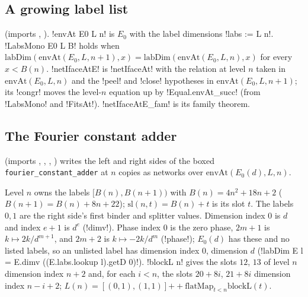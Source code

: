 {\subsection{A growing label list}

 (imports , ). \lbx!envAt E0 L n! is $E_0$ with the label dimensions \lbx!labs := L n!. \lbx!LabsMono E0 L B! holds when $\mathrm{labDim}(\mathrm{envAt}(E_0,L,n+1),x)=\mathrm{labDim}(\mathrm{envAt}(E_0,L,n),x)$ for every $x<B(n)$. \lbx!netIfaceAtE! is \lbx!netIfaceAt! with the relation at level $n$ taken in $\mathrm{envAt}(E_0,L,n)$ and the \lbx!peel! and \lbx!close! hypotheses in $\mathrm{envAt}(E_0,L,n+1)$; its \lbx!congr! moves the level-$n$ equation up by \lbx!Equal.envAt_succ! (from \lbx!LabsMono! and \lbx!FitsAt!). \lbx!netIfaceAtE_fam! is its family theorem.

\subsection{The Fourier constant adder}

 (imports , , , ) writes the left and right sides of the boxed \texttt{fourier\_constant\_adder} at $n$ copies as networks over $\mathrm{envAt}(E_0(d),L,n)$.

\begin{definition}\label{def:boxes-fca-env}
Level $n$ owns the labels $[B(n),B(n+1))$ with $B(n)=4n^2+18n+2$ ($B(n+1)=B(n)+8n+22$); $\mathrm{sl}(n,t)=B(n)+t$ is its slot $t$. The labels $0,1$ are the right side's first binder and splitter values. Dimension index $0$ is $d$ and index $e+1$ is $d^e$ (\lbx!dimv!). Phase index $0$ is the zero phase, $2m+1$ is $k\mapsto 2k/d^{m+1}$, and $2m+2$ is $k\mapsto -2k/d^{m}$ (\lbx!phase!); $E_0(d)$ has these and no listed labels, so an unlisted label has dimension index $0$, dimension $d$ (\lbx!labDim E l = E.dimv ((E.labs.lookup l).getD 0)!). \lbx!blockL n! gives the slots $12$, $13$ of level $n$ dimension index $n+2$ and, for each $i<n$, the slots $20+8i$, $21+8i$ dimension index $n-i+2$; $L(n)=[(0,1),(1,1)]\mathbin{+\!\!+}\mathrm{flatMap}_{t<n}\mathrm{blockL}(t)$.
\end{definition}

}
